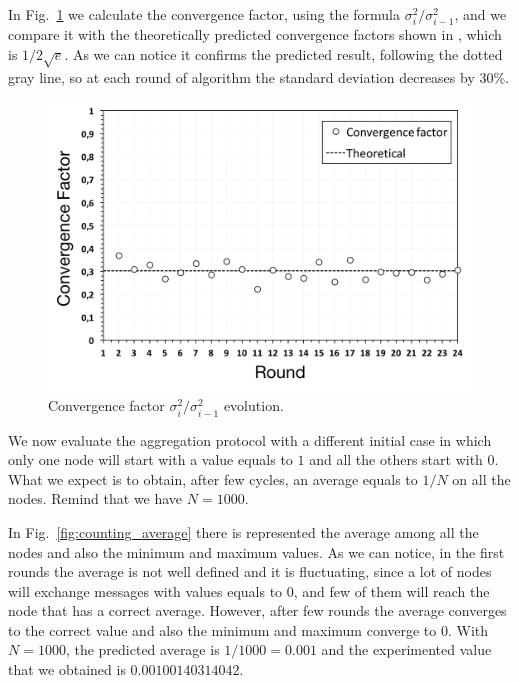 In Fig.~\ref{fig:aggregation_conv_factor} we calculate the convergence factor, using the formula $\sigma_i^2 / \sigma_{i-1}^2$, and we compare it with the theoretically predicted convergence factors shown in \cite{aggregation}, which is $1 / 2\sqrt{e}$. As we can notice it confirms the predicted result, following the dotted gray line, so at each round of algorithm the standard deviation decreases by 30\%.

\begin{figure}[ht]
  \centering
  \includegraphics[keepaspectratio=true, width=\textwidth]{images/aggregation_conv_factor}\caption{Convergence factor $\sigma_i^2 / \sigma_{i-1}^2$ evolution.}
  \label{fig:aggregation_conv_factor}
\end{figure}


\newpage
We now evaluate the aggregation protocol with a different initial case in which only one node will start with a value equals to $1$ and all the others start with $0$. What we expect is to obtain, after few cycles, an average equals to $1/N$ on all the nodes. Remind that we have $N = 1000$.

In Fig.~\ref{fig:counting_average} there is represented the average among all the nodes and also the minimum and maximum values. As we can notice, in the first rounds the average is not well defined and it is fluctuating, since a lot of nodes will exchange messages with values equals to 0, and few of them will reach the node that has a correct average. However, after few rounds the average converges to the correct value and also the minimum and maximum converge to $0$. With $N = 1000$, the predicted average is $1 / 1000 = 0.001$ and the experimented value that we obtained is $0.00100140314042$.

